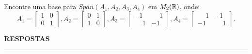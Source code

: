 \documentclass[12pt]{exam}
\begin{document}
    \begin{exercicio}
        Encontre uma base para $Span(A_1, A_2, A_3, A_4)$ em $M_2(\mathbb{R})$, onde:
        \[
        A_1 = \begin{bmatrix}
            1 & 0\\
            0 & 1
        \end{bmatrix},
        A_2 = \begin{bmatrix}
            0 & 1\\
            1 & 0
        \end{bmatrix},
        A_3 = \begin{bmatrix}
            -1 & \phantom{-} 1\\
            \phantom{-} 1 & -1
        \end{bmatrix},
        A_4 = \begin{bmatrix}
            \phantom{-} 1 & -1\\
            -1 & \phantom{-} 1
        \end{bmatrix}.
        \]
    \end{exercicio}

    \newpage


    \begin{center}
        {\large\bf RESPOSTAS}
    \end{center}

    \hrule

    
\end{document}
